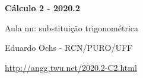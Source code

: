 \documentclass[oneside,12pt]{article}
\begin{document}


\long{}
\long{}
\long{}
\long{}
\long{}
\long{}
\long{}
\long{}
\long{}
\long{}
\long{}

\long{}
\long{}

\def\frown{\ensuremath{{=}{(}}}
\def\True {\mathbf{V}}
\def\False{\mathbf{F}}
\def\D    {\displaystyle}

\def\drafturl{http://angg.twu.net/LATEX/2020-2-C2.pdf}
\def\drafturl{http://angg.twu.net/2020.2-C2.html}
\def\draftfooter{\tiny \href{\drafturl}{\jobname{}} \ColorBrown{\shorttoday{} \hours}}

\def\St{\sen θ}
\def\Ct{\cos θ}
\def\Sqs{\sqrt{1-s^2}}

\def\pfo #1{\ensuremath{\mathsf{[#1]}}}
\def\pfot#1{\ensuremath{\textsf{[#1]}}}
\def\veq{\rotatebox{90}{$=$}}
\def\Rd{\ColorRed}


%

\thispagestyle{empty}

\begin{center}

\vspace*{1.2cm}

{\bf \Large Cálculo 2 - 2020.2}

\bsk

Aula nn: substituição trigonométrica

\bsk

Eduardo Ochs - RCN/PURO/UFF

\url{http://angg.twu.net/2020.2-C2.html}

\end{center}
\end{document}
